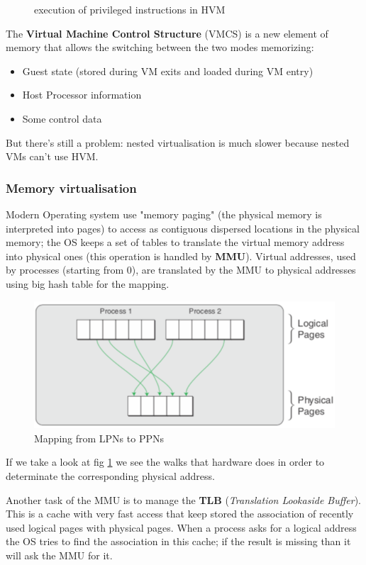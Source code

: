 \begin{itemize}
\begin{figure}[H]
        \caption{execution of privileged instructions in HVM}
    \end{figure}
    The \textbf{Virtual Machine Control Structure} (VMCS) is a new element of memory that allows the switching between the two modes memorizing:
    \begin{itemize}
        \item Guest state (stored during VM exits and loaded during VM entry)
        \item Host Processor information
        \item Some control data
    \end{itemize}
    But there's still a problem: nested virtualisation is much slower because nested VMs can't use HVM.
\end{itemize}


\subsubsection{Memory virtualisation}
Modern Operating system use "memory paging" (the physical memory is interpreted into pages) to access as contiguous dispersed locations in the physical memory; the OS keeps a set of tables to translate the virtual memory address into physical ones (this operation is handled by \textbf{MMU}). Virtual addresses, used by processes (starting from 0), are translated by the MMU to physical addresses using big hash table for the mapping.

\begin{figure}[h!]
    \centering
    \includegraphics[scale=0.3]{images/mapping_mm.png}
    \caption{Mapping from LPNs to PPNs}
    \label{fig:mapping_mm}
\end{figure}

If we take a look at fig \ref{fig:mapping_mm} we see the walks that hardware does in order to determinate the corresponding physical address.

Another task of the MMU is to manage the \textbf{TLB} (\textit{Translation Lookaside Buffer}). This is a cache with very fast access that keep stored the association of recently used logical pages with  physical pages. When a process asks for a logical address the OS tries to find the association in this cache; if the result is missing than it will ask the MMU for it.

